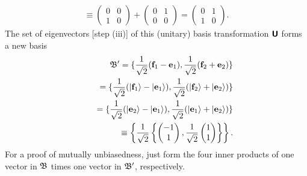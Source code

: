 {\begin{equation}
\begin{split}
\equiv
\begin{pmatrix}
0&0\\1&0
\end{pmatrix}
+
\begin{pmatrix}
0&1\\0&0
\end{pmatrix}
=
\begin{pmatrix}
0&1\\1&0
\end{pmatrix}.
\end{split}
\end{equation}
The set of eigenvectors [step (iii)] of this  (unitary) basis transformation $\textsf{\textbf{U}}$ forms a new basis
\begin{equation}
\begin{split}
{\frak B}' =
\{ \frac{1}{\sqrt{2}} ({\bf f}_1 - {\bf e}_1),
 \frac{1}{\sqrt{2}}( {\bf f}_2 + {\bf e}_2 )\}
\\
 \qquad =
\{ \frac{1}{\sqrt{2}} (\vert {\bf f}_1\rangle  - \vert {\bf e}_1\rangle ),
 \frac{1}{\sqrt{2}}(\vert  {\bf f}_2 \rangle + \vert {\bf e}_2\rangle  )\}
\\
 \qquad  =
\{ \frac{1}{\sqrt{2}} (\vert {\bf e}_2\rangle  - \vert {\bf e}_1\rangle ),
 \frac{1}{\sqrt{2}}(\vert  {\bf e}_1 \rangle + \vert {\bf e}_2\rangle  )\}
\\
 \qquad \equiv \left\{ \frac{1}{\sqrt{2}}\left\{\begin{pmatrix}-1\\1\end{pmatrix},\frac{1}{\sqrt{2}}\begin{pmatrix}1\\1\end{pmatrix}\right\}\right\}.
\end{split}
\end{equation}
For a proof of mutually unbiasedness, just form the four inner products of one vector in ${\frak B}$ times one vector in ${\frak B}'$,
respectively.

}
